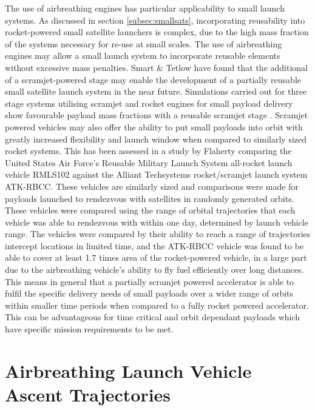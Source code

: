 The use of airbreathing engines has particular applicability to small launch systems. As discussed in section \ref{subsec:smallsats}, incorporating reusability into rocket-powered small satellite launchers is complex, due to the high mass fraction of the systems necessary for re-use at small scales. 
The use of airbreathing engines may allow a small launch system to incorporate reusable elements without excessive mass penalties. 
   Smart \& Tetlow\cite{Smart2009} have found that the additional of a scramjet-powered stage may enable the development of a partially reusable small satellite launch system in the near future. 
Simulations carried out for three stage systems utilising scramjet and rocket engines for small payload delivery show favourable payload mass fractions with a reusable scramjet stage \cite{Smart2009}. Scramjet powered vehicles may also offer the ability to put small payloads into orbit with greatly increased flexibility and launch window when compared to similarly sized rocket systems. This has been assessed in a study by Flaherty\cite{Flaherty2010} comparing the United States Air Force's Reusable Military Launch System all-rocket launch vehicle RMLS102 against the Alliant Techsystems rocket/scramjet launch system ATK-RBCC. These vehicles are similarly sized and comparisons were made for payloads launched to rendezvous with satellites in randomly generated orbits\cite{Flaherty2010}. These vehicles were compared using the range of orbital trajectories that each vehicle was able to rendezvous with within one day, determined by launch vehicle range\cite{Flaherty2010}. The vehicles were compared by their ability to reach a range of trajectories intercept locations in limited time, and the ATK-RBCC vehicle was found to be able to cover at least 1.7 times area of the rocket-powered vehicle\cite{Flaherty2010}, in a large part due to the airbreathing vehicle's ability to fly fuel efficiently over long distances. This means in general that a partially scramjet powered accelerator is able to fulfil the specific delivery needs of small payloads over a wider range of orbits within smaller time periods when compared to a fully rocket powered accelerator. This can be advantageous for time critical and orbit dependant payloads which have specific mission requirements to be met. 




 


\section{Airbreathing Launch Vehicle Ascent Trajectories}

